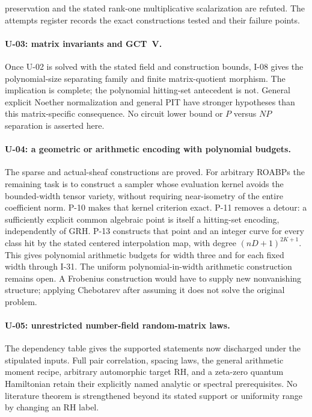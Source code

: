 preservation and the stated rank-one multiplicative scalarization are refuted. The attempts register records the exact constructions tested and their failure points.

\paragraph{U-03: matrix invariants and GCT~V.}
Once U-02 is solved with the stated field and construction bounds, I-08 gives the polynomial-size separating family and finite matrix-quotient morphism. The implication is complete; the polynomial hitting-set antecedent is not. General explicit Noether normalization and general PIT have stronger hypotheses than this matrix-specific consequence. No circuit lower bound or $P$ versus $NP$ separation is asserted here.

\paragraph{U-04: a geometric or arithmetic encoding with polynomial budgets.}
The sparse and actual-sheaf constructions are proved. For arbitrary ROABPs the remaining task is to construct a sampler whose evaluation kernel avoids the bounded-width tensor variety, without requiring near-isometry of the entire coefficient norm. P-10 makes that kernel criterion exact. P-11 removes a detour: a sufficiently explicit common algebraic point is itself a hitting-set encoding, independently of GRH. P-13 constructs that point and an integer curve for every class hit by the stated centered interpolation map, with degree $(nD+1)^{2K+1}$. This gives polynomial arithmetic budgets for width three and for each fixed width through I-31. The uniform polynomial-in-width arithmetic construction remains open. A Frobenius construction would have to supply new nonvanishing structure; applying Chebotarev after assuming it does not solve the original problem.

\paragraph{U-05: unrestricted number-field random-matrix laws.}
The dependency table gives the supported statements now discharged under the stipulated inputs. Full pair correlation, spacing laws, the general arithmetic moment recipe, arbitrary automorphic target RH, and a zeta-zero quantum Hamiltonian retain their explicitly named analytic or spectral prerequisites. No literature theorem is strengthened beyond its stated support or uniformity range by changing an RH label.

